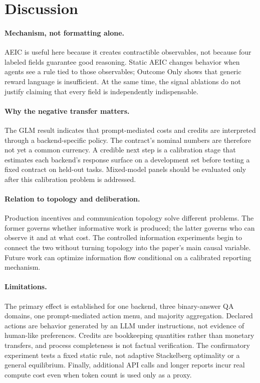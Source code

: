 \section{Discussion}
\label{sec:discussion}

\paragraph{Mechanism, not formatting alone.}
AEIC is useful here because it creates contractible observables, not because four labeled fields guarantee good reasoning. Static AEIC changes behavior when agents see a rule tied to those observables; Outcome Only shows that generic reward language is insufficient. At the same time, the signal ablations do not justify claiming that every field is independently indispensable.

\paragraph{Why the negative transfer matters.}
The GLM result indicates that prompt-mediated costs and credits are interpreted through a backend-specific policy. The contract's nominal numbers are therefore not yet a common currency. A credible next step is a calibration stage that estimates each backend's response surface on a development set before testing a fixed contract on held-out tasks. Mixed-model panels should be evaluated only after this calibration problem is addressed.

\paragraph{Relation to topology and deliberation.}
Production incentives and communication topology solve different problems. The former governs whether informative work is produced; the latter governs who can observe it and at what cost. The controlled information experiments begin to connect the two without turning topology into the paper's main causal variable. Future work can optimize information flow conditional on a calibrated reporting mechanism.

\paragraph{Limitations.}
The primary effect is established for one backend, three binary-answer QA domains, one prompt-mediated action menu, and majority aggregation. Declared actions are behavior generated by an LLM under instructions, not evidence of human-like preferences. Credits are bookkeeping quantities rather than monetary transfers, and process completeness is not factual verification. The confirmatory experiment tests a fixed static rule, not adaptive Stackelberg optimality or a general equilibrium. Finally, additional API calls and longer reports incur real compute cost even when token count is used only as a proxy.

